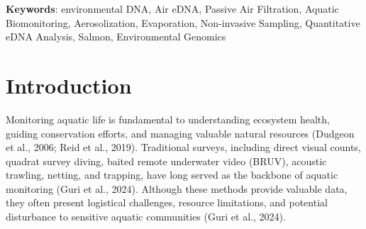 \documentclass{article}
\begin{document}


\textbf{Keywords}: environmental DNA, Air eDNA, Passive Air Filtration, Aquatic Biomonitoring, Aerosolization, Evaporation, Non-invasive Sampling, Quantitative eDNA Analysis, Salmon, Environmental Genomics

\section{Introduction}
Monitoring aquatic life is fundamental to understanding ecosystem health, guiding conservation efforts, and managing valuable natural resources (Dudgeon et al., 2006; Reid et al., 2019). Traditional surveys, including direct visual counts, quadrat survey diving, baited remote underwater video (BRUV), acoustic trawling, netting, and trapping, have long served as the backbone of aquatic monitoring (Guri et al., 2024). Although these methods provide valuable data, they often present logistical challenges, resource limitations, and potential disturbance to sensitive aquatic communities (Guri et al., 2024).
\end{document}
